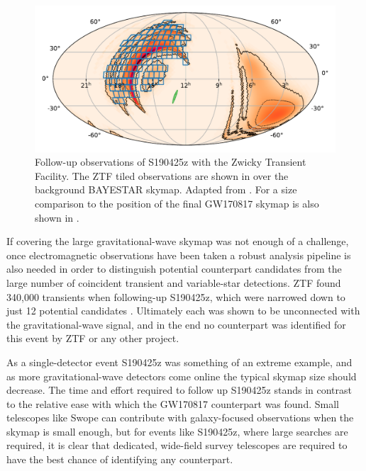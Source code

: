 \begin{colsection}
\newpage

\begin{figure}[t]
    \begin{center}
        \includegraphics[width=0.9\linewidth]{images/190425_ztf.pdf}
    \end{center}
    \caption[Follow-up observations of S190425z with ZTF]{
        Follow-up observations of S190425z with the Zwicky Transient Facility. The ZTF tiled observations are shown in  over the background BAYESTAR skymap. Adapted from \citet{S190425z_ZTF}. For a size comparison to  the position of the final GW170817 skymap is also shown in .
        }\label{fig:ztf}
\end{figure}

If covering the large gravitational-wave skymap was not enough of a challenge, once electromagnetic observations have been taken a robust analysis pipeline is also needed in order to distinguish potential counterpart candidates from the large number of coincident transient and variable-star detections. ZTF found 340,000 transients when following-up S190425z, which were narrowed down to just 12 potential candidates \citep{S190425z_ZTF}. Ultimately each was shown to be unconnected with the gravitational-wave signal, and in the end no counterpart was identified for this event by ZTF or any other project.

As a single-detector event S190425z was something of an extreme example, and as more gravitational-wave detectors come online the typical skymap size should decrease. The time and effort required to follow up S190425z stands in contrast to the relative ease with which the GW170817 counterpart was found. Small telescopes like Swope can contribute with galaxy-focused observations when the skymap is small enough, but for events like S190425z, where large searches are required, it is clear that dedicated, wide-field survey telescopes are required to have the best chance of identifying any counterpart.

\newpage

\end{colsection}


